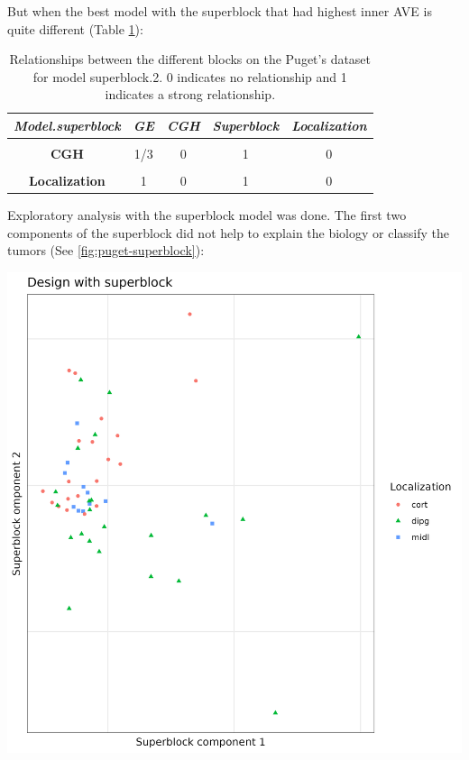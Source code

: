 \documentclass[
  12pt,
  a4paper,
  twoside,
  openright]{book}
\let\origfigure\figure
\let\endorigfigure\endfigure
\renewenvironment{figure}[1][2] {
    \expandafter\origfigure\expandafter[!ht]
} {
    \endorigfigure
}
\begin{document}
But when the best model with the superblock that had highest inner AVE is quite different (Table \ref{tab:puget-model-superblock-2}):

\begin{table}[H]

\caption[Model with superblock.2 for Puget's dataset.]{\label{tab:puget-model-superblock-2}Relationships between the different blocks on the Puget's dataset for model superblock.2. 0 indicates no relationship and 1 indicates a strong relationship.}
\centering
\begin{tabular}[t]{|>{}c|c|c|c|>{}c|}
\hline
\em{\textbf{Model.superblock}} & \em{\textbf{GE}} & \em{\textbf{CGH}} & \em{\textbf{Superblock}} & \em{\textbf{Localization}}\\
\hline
\textbf{\cellcolor{gray!6}{GE}} & \cellcolor{gray!6}{1} & \cellcolor{gray!6}{1/3} & \cellcolor{gray!6}{0} & \cellcolor{gray!6}{1}\\
\hline
\textbf{CGH} & 1/3 & 0 & 1 & 0\\
\hline
\textbf{\cellcolor{gray!6}{Superblock}} & \cellcolor{gray!6}{0} & \cellcolor{gray!6}{1} & \cellcolor{gray!6}{0} & \cellcolor{gray!6}{0}\\
\hline
\textbf{Localization} & 1 & 0 & 1 & 0\\
\hline
\end{tabular}
\end{table}

Exploratory analysis with the superblock model was done.
The first two components of the superblock did not help to explain the biology or classify the tumors (See \ref{fig:puget-superblock}):

\begin{figure}
\includegraphics[width=1\linewidth]{images/pugets_superblock} \caption[Superblock components on Puget's dataset]{First components of the superblock which has all the data of the samples on the Puget's dataset.}\label{fig:puget-superblock}
\end{figure}
\end{document}
